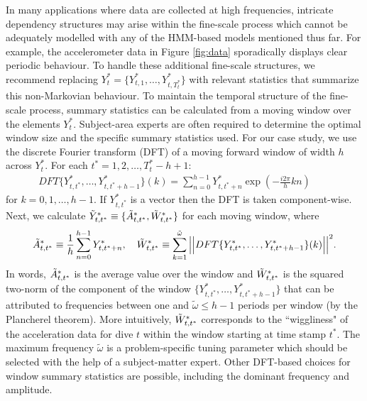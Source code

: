 In many applications where data are collected at high frequencies, intricate dependency structures may arise within the fine-scale process which cannot be adequately modelled with any of the HMM-based models mentioned thus far. For example, the accelerometer data in Figure \ref{fig:data} sporadically displays clear periodic behaviour. To handle these additional fine-scale structures, we recommend replacing $Y_t^* = \{Y^*_{t,1},\ldots,Y^*_{t,T^*_t}\}$ with relevant statistics that summarize this non-Markovian behaviour. To maintain the temporal structure of the fine-scale process, summary statistics can be calculated from a moving window over the elements $Y_t^*$. Subject-area experts are often required to determine the optimal window size and the specific summary statistics used. For our case study, we use the discrete Fourier transform (DFT) of a moving forward window of width $h$ across $Y^*_t$. For each $t^* = 1,2,\ldots,T^*_t-h+1$:
%
\begin{align*}
    DFT\{Y^*_{t,t^*},\ldots, Y^*_{t,t^*+h-1}\}(k) = \sum_{n=0}^{h-1} Y^*_{t,t^*+n}\exp\left(-\frac{i 2\pi}{h} kn \right) \qquad 
\end{align*}
%
for $k = 0, 1, \ldots, h-1$. If $Y^*_{t,t^*}$ is a vector then the DFT is taken component-wise. Next, we calculate $\tilde{Y}^*_{t,t^*} \equiv \{\tilde{A}^*_{t,t^*},\tilde{W}^*_{t,t^*}\}$ for each moving window, where
%
\begin{equation}
    \label{eqn:z}
    \Zone_{t,t^*} \equiv \frac{1}{h}\sum_{n=0}^{h-1}Y^*_{t,t^*+n}, \quad \Ztwo_{t,t^*} \equiv \sum_{k=1}^{\tilde{\omega}}\Big|\Big|DFT\{Y^*_{t,t^*},\ldots, Y^*_{t,t^*+h-1}\}(k)\Big|\Big|^2.
\end{equation}
%
In words, $\tilde{A}^*_{t,t^*}$ is the average value over the window and $\tilde{W}^*_{t,t^*}$ is the squared two-norm of the component of the window $\big\{Y^*_{t,t^*}, \ldots, Y^*_{t,t^*+h-1}\big\}$ that can be attributed to frequencies between one and $\tilde{\omega} \leq h-1$ periods per window (by the Plancherel theorem). More intuitively, $\tilde{W}^*_{t,t^*}$ corresponds to the ``wiggliness" of the acceleration data for dive $t$ within the window starting at time stamp $t^*$. The maximum frequency $\tilde{\omega}$ is a problem-specific tuning parameter which should be selected with the help of a subject-matter expert. Other DFT-based choices for window summary statistics are possible, including the dominant frequency and amplitude.

